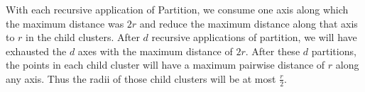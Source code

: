 With each recursive application of Partition, we consume one axis along which the maximum distance was $2r$ and reduce the maximum distance along that axis to $r$ in the child clusters.
After $d$ recursive applications of partition, we will have exhausted the $d$ axes with the maximum distance of $2r$.
After these $d$ partitions, the points in each child cluster will have a maximum pairwise distance of $r$ along any axis.
Thus the radii of those child clusters will be at most $\frac{r}{2}$.
